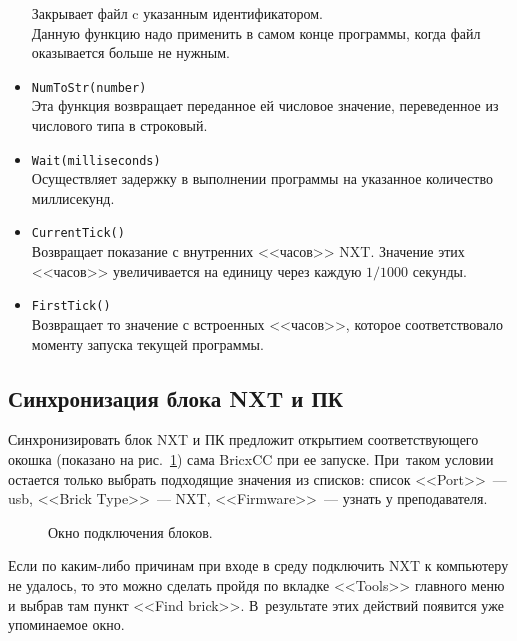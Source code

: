 \documentclass[12pt,a4paper,openany]{extarticle}
\begin{document}
\begin{itemize}
Закрывает файл c указанным идентификатором. 
\\Данную функцию надо применить в самом конце программы, когда файл оказывается больше не нужным.
\item \verb|NumToStr(number)|\\
Эта функция возвращает переданное ей числовое значение, переведенное из числового типа в строковый.
\item \verb|Wait(milliseconds)|\\
Осуществляет задержку в выполнении программы на указанное количество миллисекунд.
\item \verb|CurrentTick()|\\
Возвращает показание с внутренних <<часов>> NXT.
Значение этих <<часов>> увеличивается на единицу через каждую $1/1000$ секунды.    
\item \verb|FirstTick()|\\
Возвращает то значение с встроенных <<часов>>, которое соответствовало моменту запуска текущей программы. 
\end{itemize}
\subsection{Синхронизация блока NXT и ПК}
\hspace*{\parindent}Синхронизировать блок NXT и ПК предложит открытием соответствующего окошка (показано на рис.~\ref{sinhr}) сама BricxCC при ее запуске. 
При~таком условии остается только выбрать подходящие значения из списков: список <<Port>>~--- usb, <<Brick Type>>~--- NXT, <<Firmware>>~--- узнать у преподавателя. 

\begin{figure}[h]
	\noindent{}
	\caption{Окно подключения блоков.}
	\label{sinhr}
\end{figure}

Если по каким-либо причинам при входе в среду подключить NXT к компьютеру не удалось, то это можно сделать пройдя по вкладке <<Tools>> главного меню и выбрав там пункт <<Find brick>>. 
В~результате этих действий появится уже упоминаемое окно. 
\end{document}
